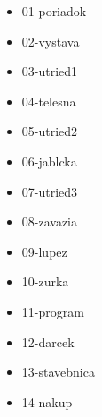 



\begin{itemize}
\item 01-poriadok
\item 02-vystava
\item 03-utried1
\item 04-telesna
\item 05-utried2
\item 06-jablcka
\item 07-utried3
\item 08-zavazia
\item 09-lupez
\item 10-zurka
\item 11-program
\item 12-darcek
\item 13-stavebnica
\item 14-nakup
\end{itemize}

